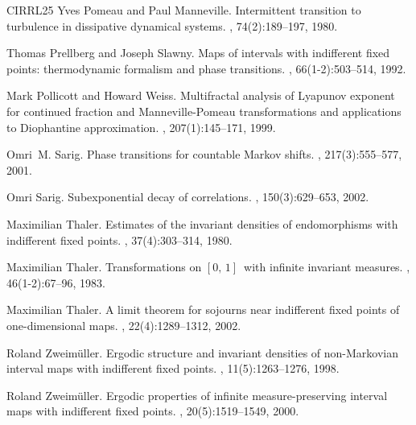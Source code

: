 \documentclass[12pt]{amsart}
\numberwithin{equation}{section} %
\numberwithin{figure}{section} %
\theoremstyle{plain}
\theoremstyle{definition}
\theoremstyle{remark}
\theoremstyle{citing}
\renewcommand{\=}{\coloneqq}
\begin{document}
\begin{thebibliography}{CIRRL25}
Yves Pomeau and Paul Manneville.
\newblock Intermittent transition to turbulence in dissipative dynamical systems.
, 74(2):189--197, 1980.

Thomas Prellberg and Joseph Slawny.
\newblock Maps of intervals with indifferent fixed points: thermodynamic formalism and phase transitions.
, 66(1-2):503--514, 1992.

Mark Pollicott and Howard Weiss.
\newblock Multifractal analysis of {L}yapunov exponent for continued fraction and {M}anneville-{P}omeau transformations and applications to {D}iophantine approximation.
, 207(1):145--171, 1999.

Omri~M. Sarig.
\newblock Phase transitions for countable {M}arkov shifts.
, 217(3):555--577, 2001.

Omri Sarig.
\newblock Subexponential decay of correlations.
, 150(3):629--653, 2002.

Maximilian Thaler.
\newblock Estimates of the invariant densities of endomorphisms with indifferent fixed points.
, 37(4):303--314, 1980.

Maximilian Thaler.
\newblock Transformations on {$[0,\,1]$}\ with infinite invariant measures.
, 46(1-2):67--96, 1983.

Maximilian Thaler.
\newblock A limit theorem for sojourns near indifferent fixed points of one-dimensional maps.
, 22(4):1289--1312, 2002.

Roland Zweim\"uller.
\newblock Ergodic structure and invariant densities of non-{M}arkovian interval maps with indifferent fixed points.
, 11(5):1263--1276, 1998.

Roland Zweim\"uller.
\newblock Ergodic properties of infinite measure-preserving interval maps with indifferent fixed points.
, 20(5):1519--1549, 2000.

\end{thebibliography}
 
\end{document}
